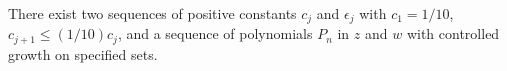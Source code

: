 
There exist two sequences of positive constants $c_j$ and $\epsilon_j$ with $c_1 = 1/10$, $c_{j+1} \leq (1/10)c_j$, and a sequence of polynomials $P_n$ in $z$ and $w$ with controlled growth on specified sets.
